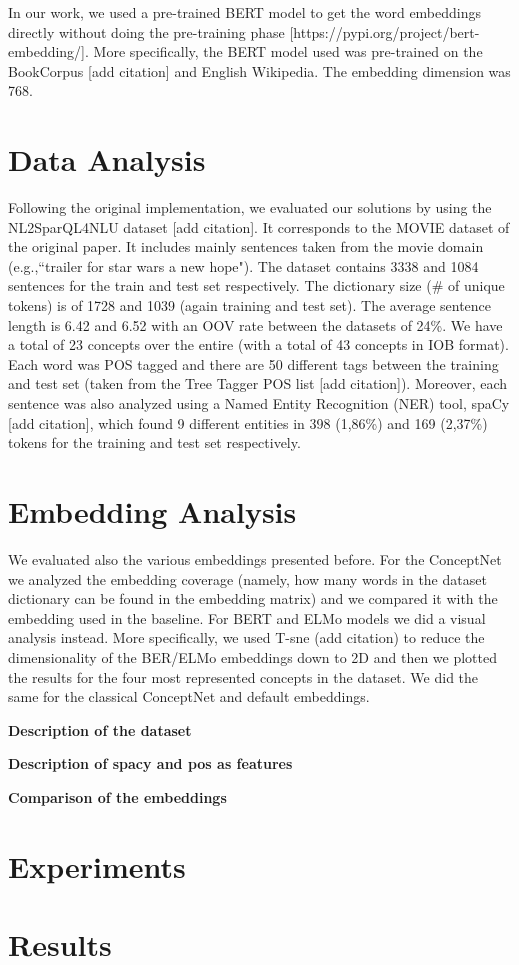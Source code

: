\documentclass[11pt,a4paper]{article}
\begin{document}
In our work, we used a pre-trained BERT model to get the word embeddings directly without doing the pre-training phase [https://pypi.org/project/bert-embedding/]. More specifically, the BERT model used was pre-trained on the BookCorpus [add citation] and English Wikipedia. The embedding dimension was 768. 



\section{Data Analysis}

Following the original implementation, we evaluated our solutions by using the NL2SparQL4NLU dataset [add citation]. It corresponds to the MOVIE dataset of the original paper. It includes mainly sentences taken from the movie domain (e.g.,``trailer for star wars a new hope"). The dataset contains 3338 and 1084 sentences for the train and test set respectively. The dictionary size (\# of unique tokens) is of 1728 and 1039  (again training and test set). The average sentence length is 6.42 and 6.52 with an OOV rate between the datasets of 24\%. We have a total of 23 concepts over the entire (with a total of 43 concepts in IOB format). Each word was POS tagged and there are 50 different tags between the training and test set (taken from the Tree Tagger POS list [add citation]). Moreover, each sentence was also analyzed using a Named Entity Recognition (NER) tool, spaCy [add citation], which found 9 different entities in 398 (1,86\%)  and 169 (2,37\%) tokens for the training and test set respectively.

\section{Embedding Analysis}
We evaluated also the various embeddings presented before. For the ConceptNet we analyzed the embedding coverage (namely, how many words in the dataset dictionary can be found in the embedding matrix) and we compared it with the embedding used in the baseline. For BERT and ELMo models we did a visual analysis instead. More specifically, we used T-sne (add citation) to reduce the dimensionality of the BER/ELMo embeddings down to 2D and then we plotted the results for the four most represented concepts in the dataset. We did the same for the classical ConceptNet and default embeddings.

\textbf{Description of the dataset}

\textbf{Description of spacy and pos as features}

\textbf{Comparison of the embeddings}

\section{Experiments}



\section{Results}

%
%
\end{document}
